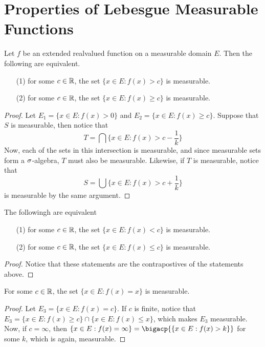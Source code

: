\section{Properties of Lebesgue Measurable Functions}

\begin{lemma}\label{3.1.1}
    Let $f$ be an extended realvalued function on a measurable domain  $E$. Then
    the following are equivalent.
    \begin{enumerate}
        \item[(1)] for some $c \in \mathbb{R}$, the set $\{x \in E : f(x)>c\}$ is
            measurable.

         \item[(2)] for some $c \in \mathbb{R}$, the set $\{x \in E : f(x) \geq c\}$ is
            measurable.
    \end{enumerate}
\end{lemma}
\begin{proof}
    Let $E_1=\{x \in E : f(x)>0\}$ and $E_2=\{x \in E : f(x) \geq c\}$. Suppose
    that $S$ is measurable, then notice that
    \begin{equation*}
        T=\bigcap{\{x \in E : f(x)>c-\frac{1}{k}\}}
    \end{equation*}
    Now, each of the sets in this intersection is measurable, and since
    measurable sets form a $\sigma$-algebra, $T$ must also be measurable. Likewise,
    if $T$ is measurable, notice that
    \begin{equation*}
        S=\bigcup{\{x \in E : f(x)>c+\frac{1}{k}\}}
    \end{equation*}
    is measurable by the same argument.
\end{proof}
\begin{corollary}
    The followingh are equivalent
    \begin{enumerate}
    \item[(1)] for some $c \in \mathbb{R}$, the set $\{x \in E : f(x)<c\}$ is
        measurable.

         \item[(2)] for some $c \in \mathbb{R}$, the set $\{x \in E : f(x) \leq c\}$ is
            measurable.
    \end{enumerate}
\end{corollary}
\begin{proof}
    Notice that these statements are the contrapostives of the statements above.
\end{proof}
\begin{corollary}
    For some $c \in \mathbb{R}$, the set  $\{x \in E : f(x)=x\}$ is measurable.
\end{corollary}
\begin{proof}
    Let $E_3=\{x \in E : f(x)=c\}$. If $c$ is finite, notice that  $E_3=\{x \in
    E : f(x) \geq c\} \cap \{x \in E : f(x) \leq x\}$, which makes $E_3$
    measurable. Now, if $c=\infty$, then  $\{x \in E : f(x)=\infty\}=\bigacp{\{x
    \in E : f(x)>k\}}$ for some $k$, which is again, measurable.
\end{proof}

